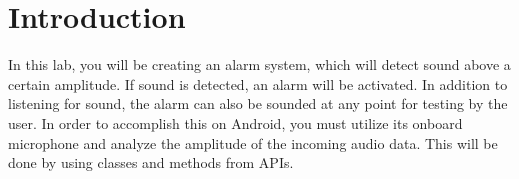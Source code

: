 \section{Introduction}

In this lab, you will be creating an alarm system, which will detect sound above a certain amplitude. If sound is detected, an alarm will be activated. In addition to listening for sound, the alarm can also be sounded at any point for testing by the user. In order to accomplish this on Android, you must utilize its onboard microphone and analyze the amplitude of the incoming audio data. This will be done by using classes and methods from APIs.